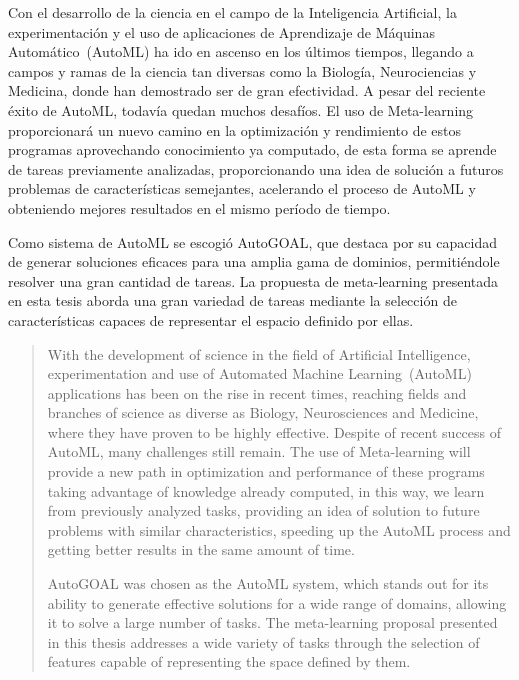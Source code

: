 \begin{resumen}
	Con el desarrollo de la ciencia en el campo de la Inteligencia Artificial,
	la experimentación y el uso de aplicaciones de Aprendizaje de Máquinas
	Automático~(AutoML) ha ido en ascenso en los últimos tiempos, llegando a
	campos y ramas de la ciencia tan diversas como la Biología, Neurociencias y
	Medicina, donde han demostrado ser de gran efectividad. A pesar del
	reciente éxito de AutoML, todavía quedan muchos desafíos. El uso de
	Meta-learning proporcionará un nuevo camino en la optimización y
	rendimiento de estos programas aprovechando conocimiento ya computado, de
	esta forma se aprende de tareas previamente analizadas, proporcionando una
	idea de solución a futuros	problemas de características semejantes,
	acelerando el proceso de AutoML y obteniendo mejores resultados en el mismo
	período de tiempo. 

	Como sistema de AutoML se escogió AutoGOAL, que destaca por su capacidad de
	generar soluciones eficaces para una amplia gama de dominios, permitiéndole
	resolver una gran cantidad de tareas. La propuesta de meta-learning
	presentada en esta tesis aborda una gran variedad de tareas mediante la
	selección de características capaces de representar el espacio definido por
	ellas.
\end{resumen}

\begin{abstract}
	With the development of science in the field of Artificial Intelligence,
	experimentation and use of Automated Machine Learning~(AutoML) applications
	has been on the rise in recent times, reaching fields and branches of
	science as diverse as Biology, Neurosciences and Medicine, where they have
	proven to be highly effective. Despite of recent success of AutoML, many
	challenges still remain. The use of Meta-learning will provide a new path
	in optimization and performance of these programs taking advantage of
	knowledge already computed, in this way, we learn from previously analyzed
	tasks, providing an idea of solution to future problems with similar
	characteristics, speeding up the AutoML process and getting better results
	in the same amount of time.
	
	AutoGOAL was chosen as the AutoML system, which stands out for its ability
	to generate effective solutions for a wide range of domains, allowing it
	to solve a large number of tasks. The meta-learning proposal presented in
	this thesis addresses a wide variety of tasks through the selection of
	features capable of representing the space defined by them.
\end{abstract}